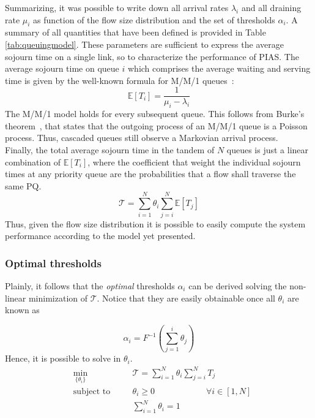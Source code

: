 Summarizing, it was possible to write down all arrival rates $\lambda_{i}$ and all draining rate $\mu_i$ as function of the flow size distribution and the set of thresholds $\alpha_i$. A summary of all quantities that have been defined is provided in Table \ref{tab:queuingmodel}.
These parameters are sufficient to express the average sojourn time on a single link, so to characterize the performance of PIAS. The average sojourn time on queue $i$ which comprises the average waiting and serving time is given by the well-known formula for M/M/1 queues~\cite{klein-queuing-theory}:
\begin{equation}
\label{mm1}
\mathbb{E}[T_i] = \dfrac{1}{\mu_i-\lambda_i}
\end{equation}
The M/M/1 model holds for every subsequent queue. This follows from Burke's theorem~\cite{burke}, that states that the outgoing process of an M/M/1 queue is a Poisson process. Thus, cascaded queues still observe a Markovian arrival process. \\
Finally, the total average sojourn time in the tandem of $N$ queues is just a linear combination of $\mathbb{E}[T_i]$, where the coefficient that weight the individual sojourn times at any priority queue are the probabilities that a flow shall traverse the same PQ.
\begin{equation}
\mathcal{T} = 
\sum_{i=1}^{N} \theta_i \sum_{j=i}^{N}\mathbb{E}[T_j]
\end{equation}
Thus, given the flow size distribution it is possible to easily compute the system performance according to the model yet presented. 

\subsubsection{Optimal thresholds}
\label{sec:pias-queueing-model}
Plainly, it follows that the \textit{optimal} thresholds $\alpha_i$ can be derived solving the non-linear minimization of $\mathcal{T}$. Notice that they are easily obtainable once all $\theta_i$ are known as 

\[
\alpha_i = F^{-1}(\sum_{j=1}^{i}\theta_j)
\]
Hence, it is possible to solve in $\theta_i$.
\begin{equation}
\label{eq::costfunction}
\begin{aligned}
&\underset{\{\theta_i\}}{\text{min}} \quad  & &\mathcal{T} = 
\sum_{i=1}^{N} \theta_i \sum_{j=i}^{N}T_j \\
&\text{subject to} \quad  & &\theta_i \ge 0 \qquad \qquad \qquad \forall i \in [1,N]  \\
& & & \sum_{i=1}^{N} \theta_i = 1 
\end{aligned}
\end{equation}

